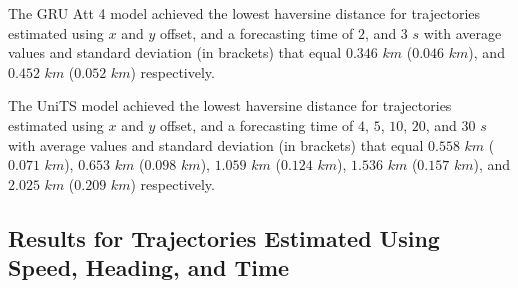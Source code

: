 \begin{table}[!ht]
	\centering
	\caption{The average haversine distance in $km$, with standard deviation in brackets, across $k$-fold validation datasets for the trajectories in the $k$-fold testing datasets estimated using $x$ and $y$ offset, different RNN models, and forecasting times.}
	\label{tab:best_no_abs_haversine}
\end{table}

The GRU Att 4 model achieved the lowest haversine distance for trajectories estimated using $x$ and $y$ offset, and a forecasting time of $2$, and $3$ $s$ with average values and standard deviation (in brackets) that equal $0.346$ $km$ ($0.046$ $km$), and $0.452$ $km$ ($0.052$ $km$) respectively.

The UniTS model achieved the lowest haversine distance for trajectories estimated using $x$ and $y$ offset, and a forecasting time of $4$, $5$, $10$, $20$, and $30$ $s$ with average values and standard deviation (in brackets) that equal $0.558$ $km$ ($0.071$ $km$), $0.653$ $km$ ($0.098$ $km$), $1.059$ $km$ ($0.124$ $km$), $1.536$ $km$ ($0.157$ $km$), and $2.025$ $km$ ($0.209$ $km$) respectively.

\subsection{Results for Trajectories Estimated Using Speed, Heading, and Time}

